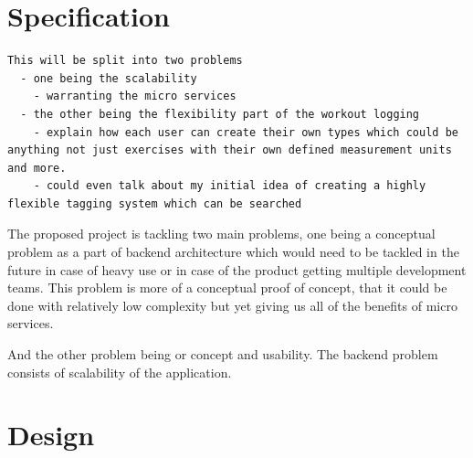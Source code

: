 \documentclass{article}
\newcommand{\vspaceconst}{-2ex}
\begin{document}
\begin{multicols}{2}
\section{Specification}
\vspace{\vspaceconst}

\begin{verbatim}
This will be split into two problems
  - one being the scalability
    - warranting the micro services
  - the other being the flexibility part of the workout logging
    - explain how each user can create their own types which could be anything not just exercises with their own defined measurement units and more. 
    - could even talk about my initial idea of creating a highly flexible tagging system which can be searched
\end{verbatim}

The proposed project is tackling two main problems, one being a conceptual problem as a part of backend architecture which would need to be tackled in the future in case of heavy use or in case of the product getting multiple development teams. This problem is more of a conceptual proof of concept, that it could be done with relatively low complexity but yet giving us all of the benefits of micro services.

And the other problem being or concept and usability. The backend problem consists of scalability of the application.

\newpage

\section{Design}
\vspace{\vspaceconst}


\end{multicols}
\end{document}
